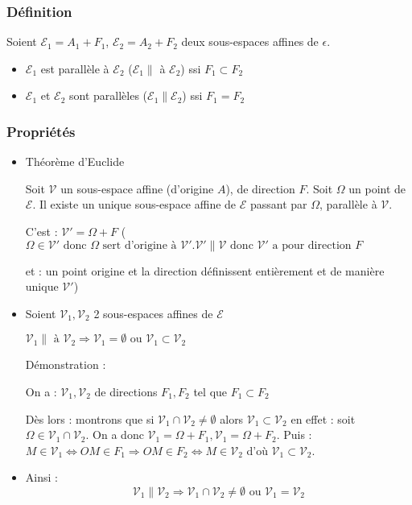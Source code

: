 \documentclass[12pt,a4paper,french]{book}
\begin{document}
			\subsubsection{Définition}
				Soient $\mathcal{E}_1 = A_1 + F_1$, $\mathcal{E}_2 = A_2 + F_2$ deux sous-espaces affines de $\epsilon$.
				\begin{itemize}
					\item $\mathcal{E}_1$ est parallèle à $\mathcal{E}_2$ ($\mathcal{E}_1 \parallel $ à $ \mathcal{E}_2$) ssi $F_1 \subset F_2$
					\item $\mathcal{E}_1$ et $\mathcal{E}_2$ sont parallèles ($\mathcal{E}_1 \parallel \mathcal{E}_2$) ssi $F_1 = F_2$
				\end{itemize}
			\subsubsection{Propriétés}
				\begin{itemize}
					\item Théorème d'Euclide
					
					Soit $\mathcal{V}$ un sous-espace affine (d'origine $A$), de direction $F$. Soit $\Omega$ un point de $\mathcal{E}$. Il existe un unique sous-espace affine de $\mathcal{E}$ passant par $\Omega$, parallèle à $\mathcal{V}$.
					
					C'est : $\mathcal{V}' = \Omega + F$ ($\Omega \in \mathcal{V}' \mbox{ donc } \Omega \mbox{ sert d'origine à } \mathcal{V}'. \mathcal{V}'\parallel \mathcal{V} \mbox{ donc } \mathcal{V}' \mbox{ a pour direction } F$
					
					et : un point origine et la direction définissent entièrement et de manière unique $\mathcal{V}'$)
					\item Soient $\mathcal{V}_1,\mathcal{V}_2$ 2 sous-espaces affines de $\mathcal{E}$
					
					$\mathcal{V}_1\parallel \mbox{ à } \mathcal{V}_2 \Rightarrow \mathcal{V}_1  = \emptyset \mbox{ ou }\mathcal{V}_1 \subset \mathcal{V}_2 $
					
					Démonstration : 
					
					On a : $\mathcal{V}_1,\mathcal{V}_2$ de directions $F_1,F_2$ tel que $F_1 \subset F_2$
					
					Dès lors : montrons que si $\mathcal{V}_1 \cap\mathcal{V}_2 \neq\emptyset$ alors  $\mathcal{V}_1 \subset \mathcal{V}_2$ 
					en effet : soit $\Omega \in \mathcal{V}_1 \cap\mathcal{V}_2$. On a donc $\mathcal{V}_1  = \Omega + F_1, \mathcal{V}_1  = \Omega + F_2 $.
					Puis : $M \in \mathcal{V}_1 \Leftrightarrow OM \in F_1 \Rightarrow OM \in F_2 \Leftrightarrow M \in \mathcal{V}_2$ d'où $\mathcal{V}_1 \subset \mathcal{V}_2$.
					\item Ainsi : \[\mathcal{V}_1\parallel  \mathcal{V}_2 \Rightarrow \mathcal{V}_1 \cap\mathcal{V}_2 \neq\emptyset \mbox{ ou } \mathcal{V}_1 = \mathcal{V}_2\]
				\end{itemize}	
\end{document}
